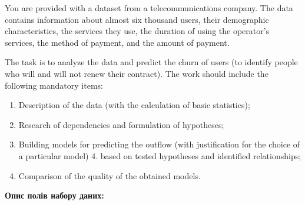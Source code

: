 \documentclass[
]{book}
\providecommand{\tightlist}{%
  \setlength{\itemsep}{0pt}\setlength{\parskip}{0pt}}
\begin{document}
You are provided with a dataset from a telecommunications company. The data contains information about almost six thousand users, their demographic characteristics, the services they use, the duration of using the operator's services, the method of payment, and the amount of payment.

The task is to analyze the data and predict the churn of users (to identify people who will and will not renew their contract). The work should include the following mandatory items:

\begin{enumerate}
\def\labelenumi{\arabic{enumi}.}
\tightlist
\item
  Description of the data (with the calculation of basic statistics);
\item
  Research of dependencies and formulation of hypotheses;
\item
  Building models for predicting the outflow (with justification for the choice of a particular model) 4. based on tested hypotheses and identified relationships;
\item
  Comparison of the quality of the obtained models.
\end{enumerate}

\textbf{Опис полів набору даних:}
\end{document}
